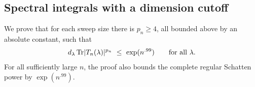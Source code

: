 \subsection{Spectral integrals with a dimension cutoff}
\begin{theorem}\label{tra:asymmetric:trace}
\label{tra:asymmetric:trace-statement}
We prove that for each sweep size there is \(p_n\ge 4\), all bounded above by an absolute constant, such that
\begin{equation}
                     d_\lambda\,{\rm Tr}|T_n(\lambda)|^{p_n}
                            \ \le\ \exp(n^{.99})
                     \qquad\text{for all }\lambda.
                          \label{tra:asymmetric:eq10}
\end{equation}
For all sufficiently large $n$, the proof also bounds the complete regular Schatten power by $\exp(n^{.99})$.
\end{theorem}
